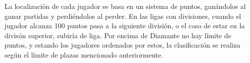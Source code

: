 La localización de cada jugador se basa en un sistema de puntos, ganándolos al ganar partidas y perdiéndolos al perder. En las ligas con divisiones, cuando el jugador alcanza 100 puntos pasa a la siguiente división, o el caso de estar en la divisón superior, subiría de liga. Por encima de Diamante no hay límite de puntos, y estando los jugadores ordenados por estos, la clasificación se realiza según el límite de plazas mencionado anteriormente.
 

%
%
%
%
%
%
%
%
%
%
%
%
%
%
%
%
%
%
%
